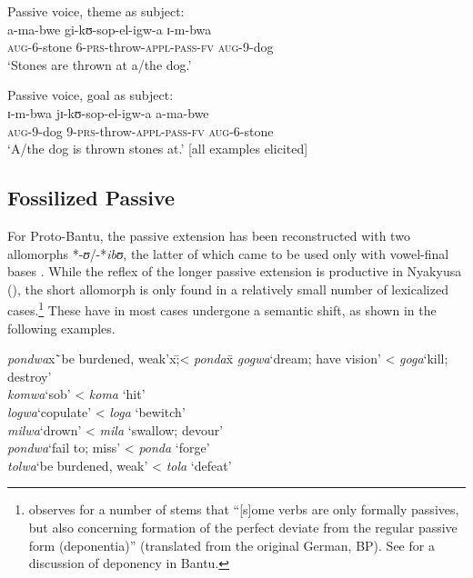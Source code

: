 \begin{exe}
\begin{xlist}
\ex Passive voice, theme as subject:\\
\gll a-ma-bwe gi-kʊ-sop-el-igw-a ɪ-m-bwa\\
\textsc{aug}-6-stone 6-\textsc{prs}-throw-\textsc{appl}-\textsc{pass}-\textsc{fv} \textsc{aug}-9-dog\\
\glt \lq Stones are thrown at a/the dog.'

\clearpage %

\ex Passive voice, goal as subject:\\
\gll ɪ-m-bwa jɪ-kʊ-sop-el-igw-a a-ma-bwe\\
\textsc{aug}-9-dog 9-\textsc{prs}-throw-\textsc{appl}-\textsc{pass}-\textsc{fv} \textsc{aug}-6-stone\\
\glt \lq A/the dog is thrown stones at.' [all examples elicited]
\end{xlist}
\end{exe}
\protect{}

\subsection{Fossilized Passive} \label{FossilizedPassive}
For Proto-Bantu, the passive extension has been reconstructed with two allomorphs \mbox{*-\textit{ʊ}/}\mbox{-*\textit{ibʊ}}, the latter of which came to be used only with vowel-final bases \citep[78]{SchadebergT2003a}. While the reflex of the longer passive extension is productive in Nyakyusa (), the short allomorph is only found in a relatively small number of lexicalized cases.\footnote{\citet[36]{SchumannK1899} observes for a number of stems that ``[s]ome verbs are only formally passives, but also concerning formation of the perfect deviate from the regular passive form (deponentia)'' (translated from the original German, BP). See \citet{GoodJ2007} for a discussion of deponency in Bantu.} These have in most cases undergone a semantic shift, as shown in the following examples.

\begin{exe}
\ex \label{exLexicalizedPassivesSemanticShift}
\begin{tabbing}
\textit{pondwa}x\=`be burdened, weak'x\=;< \textit{ponda}x\=\kill%
\textit{gogwa}\>`dream; have vision'\> < \textit{goga}\>`kill; destroy'\\
\textit{komwa}\>`sob'\> < \textit{koma}\> \lq hit'\\
\textit{logwa}\>`copulate'\> < \textit{loga}\> \lq bewitch'\\
\textit{milwa}\>`drown'\> < \textit{mila}\> \lq swallow; devour'\\
\textit{pondwa}\>`fail to; miss'\> < \textit{ponda}\> \lq forge'\\
\textit{tolwa}\>`be burdened, weak'\> < \textit{tola}\> \lq defeat'
\end{tabbing}
\end{exe}

